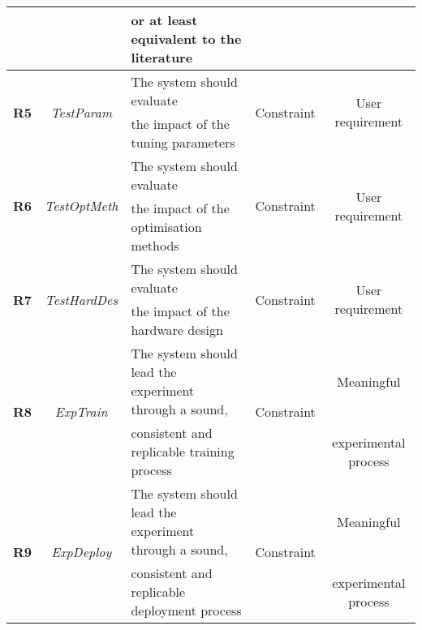 \begin{table}[!]
{\begin{tabular}{| c c l c c |}
                                  &                                         & or at least equivalent to the literature &                             & \\ \hline
    \multirow{2}{*}{\textbf{R5}}  & \multirow{2}{*}{\emph{TestParam}}       & The system should evaluate                                             & \multirow{2}{*}{Constraint} & \multirow{2}{*}{User requirement} \\
                                  &                                         & the impact of the tuning parameters                                    &                             & \\ \hline
    \multirow{2}{*}{\textbf{R6}}  & \multirow{2}{*}{\emph{TestOptMeth}}     & The system should evaluate                                             & \multirow{2}{*}{Constraint} & \multirow{2}{*}{User requirement} \\
                                  &                                         & the impact of the optimisation methods                                 &                             & \\ \hline
    \multirow{2}{*}{\textbf{R7}}  & \multirow{2}{*}{\emph{TestHardDes}}     & The system should evaluate                                             & \multirow{2}{*}{Constraint} & \multirow{2}{*}{User requirement} \\
                                  &                                         & the impact of the hardware design                                      &                             & \\ \hline
    \multirow{2}{*}{\textbf{R8}}  & \multirow{2}{*}{\emph{ExpTrain}}        & The system should lead the experiment through a sound,                 & \multirow{2}{*}{Constraint} & Meaningful \\
                                  &                                         & consistent and replicable training process                             &                             & experimental process\\\hline
    \multirow{2}{*}{\textbf{R9}}  & \multirow{2}{*}{\emph{ExpDeploy}}       & The system should lead the experiment through a sound,                 & \multirow{2}{*}{Constraint} & Meaningful \\
                                  &                                         & consistent and replicable deployment process                           &                             & experimental process\\ \hline

\end{tabular}}
\end{table}

